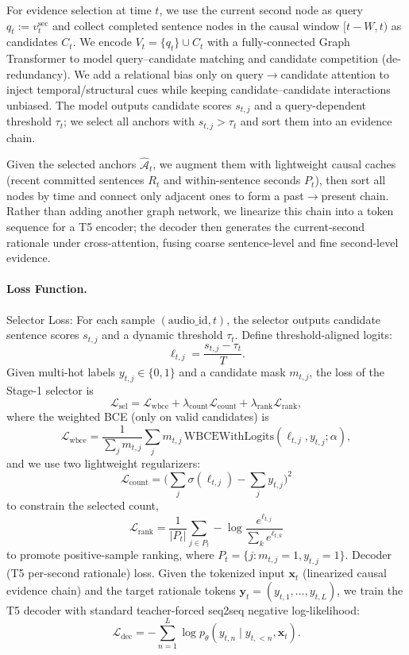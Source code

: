 For evidence selection at time $t$, we use the current second node as query $q_t:=v_t^{\mathrm{sec}}$ and collect completed sentence nodes in the causal window $[t\!-\!W,t)$ as candidates $C_t$. We encode $V_t=\{q_t\}\cup C_t$ with a fully-connected Graph Transformer to model query--candidate matching and candidate competition (de-redundancy). We add a relational bias only on query$\rightarrow$candidate attention to inject temporal/structural cues while keeping candidate--candidate interactions unbiased. The model outputs candidate scores $s_{t,j}$ and a query-dependent threshold $\tau_t$; we select all anchors with $s_{t,j}>\tau_t$ and sort them into an evidence chain.

Given the selected anchors $\hat{\mathcal A}_t$, we augment them with lightweight causal caches (recent committed sentences $R_t$ and within-sentence seconds $P_t$), then sort all nodes by time and connect only adjacent ones to form a past$\rightarrow$present chain. Rather than adding another graph network, we linearize this chain into a token sequence for a T5 encoder; the decoder then generates the current-second rationale under cross-attention, fusing coarse sentence-level and fine second-level evidence.
\paragraph{Loss Function.}
Selector Loss: For each sample $(\text{audio\_id},t)$, the selector outputs candidate sentence scores $s_{t,j}$ and a dynamic threshold $\tau_t$. Define threshold-aligned logits:
\[
\ell_{t,j}=\frac{s_{t,j}-\tau_t}{T}.
\]
Given multi-hot labels $y_{t,j}\in\{0,1\}$ and a candidate mask $m_{t,j}$, the loss of the Stage-1 selector is
\[
\mathcal{L}_{\mathrm{sel}}
=\mathcal{L}_{\mathrm{wbce}}
+\lambda_{\mathrm{count}}\mathcal{L}_{\mathrm{count}}
+\lambda_{\mathrm{rank}}\mathcal{L}_{\mathrm{rank}},
\]
where the weighted BCE (only on valid candidates) is
\[
\mathcal{L}_{\mathrm{wbce}}
=\frac{1}{\sum_j m_{t,j}}\sum_j m_{t,j}\,\mathrm{WBCEWithLogits}(\ell_{t,j},y_{t,j};\alpha),
\]
and we use two lightweight regularizers:
\[
\mathcal{L}_{\mathrm{count}}=\Big(\sum_j\sigma(\ell_{t,j})-\sum_j y_{t,j}\Big)^2
\]
to constrain the selected count,
\[
\mathcal{L}_{\mathrm{rank}}=\frac{1}{|P_t|}\sum_{j\in P_t}-\log\frac{e^{\ell_{t,j}}}{\sum_k e^{\ell_{t,k}}}
\]
to promote positive-sample ranking, where $P_t=\{j:m_{t,j}=1,y_{t,j}=1\}$.
Decoder (T5 per-second rationale) loss.
Given the tokenized input $\mathbf{x}_t$ (linearized causal evidence chain) and the target rationale tokens $\mathbf{y}_t=(y_{t,1},\ldots,y_{t,L})$, we train the T5 decoder with standard teacher-forced seq2seq negative log-likelihood:
\[
\mathcal{L}_{\mathrm{dec}}
=-\sum_{n=1}^{L}\log p_\theta\!\left(y_{t,n}\mid y_{t,<n},\mathbf{x}_t\right).
\]
